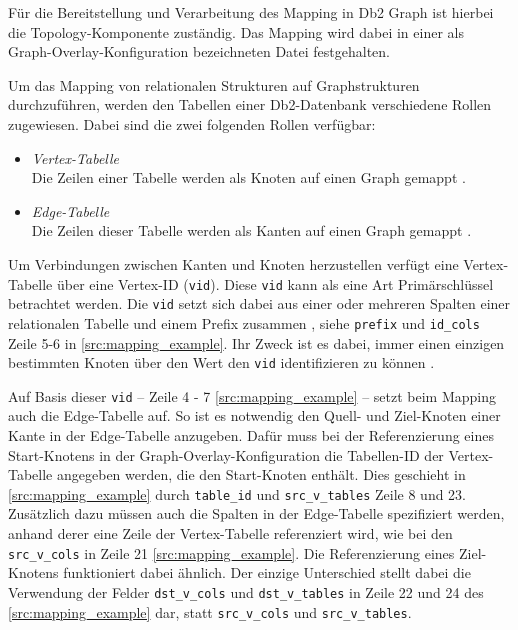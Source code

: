 Für die Bereitstellung und Verarbeitung des Mapping in Db2 Graph ist hierbei die Topology-Komponente zuständig. Das Mapping wird dabei in einer als Graph-Overlay-Konfiguration bezeichneten Datei festgehalten.  

Um das Mapping von relationalen Strukturen auf Graphstrukturen durchzuführen, werden den Tabellen einer Db2-Datenbank verschiedene Rollen zugewiesen. Dabei sind die zwei folgenden Rollen verfügbar:
\begin{itemize}
    \item \textit{Vertex-Tabelle}\\Die Zeilen einer Tabelle werden als Knoten auf einen Graph gemappt \cite{sigmod_tian, yt_tian}.
    \item \textit{Edge-Tabelle}\\Die Zeilen dieser Tabelle werden als Kanten auf einen Graph gemappt \cite{sigmod_tian, yt_tian}.
\end{itemize}


Um Verbindungen zwischen Kanten und Knoten herzustellen verfügt eine Vertex-Tabelle über eine Vertex-ID (\texttt{vid}). Diese \texttt{vid} kann als eine Art Primärschlüssel betrachtet werden. Die \texttt{vid} setzt sich dabei aus einer oder mehreren Spalten einer relationalen Tabelle und einem Prefix zusammen \cite{sigmod_tian, yt_tian}, siehe \texttt{prefix} und \texttt{id\_cols} Zeile 5-6 in \autoref{src:mapping_example}. Ihr Zweck ist es dabei, immer einen einzigen bestimmten Knoten über den Wert den \texttt{vid} identifizieren zu können \cite{sigmod_tian, yt_tian}. 

Auf Basis dieser \texttt{vid} -- Zeile 4 - 7 \autoref{src:mapping_example} -- setzt beim Mapping auch die Edge-Tabelle auf. So ist es notwendig den Quell- und Ziel-Knoten einer Kante in der Edge-Tabelle anzugeben. Dafür muss bei der Referenzierung eines Start-Knotens in der Graph-Overlay-Konfiguration die Tabellen-ID der Vertex-Tabelle angegeben werden, die den Start-Knoten enthält. Dies geschieht in \autoref{src:mapping_example} durch \texttt{table\_id} und \texttt{src\_v\_tables} Zeile 8 und 23. Zusätzlich dazu müssen auch die Spalten in der Edge-Tabelle spezifiziert werden, anhand derer eine Zeile der Vertex-Tabelle referenziert wird, wie bei den \texttt{src\_v\_cols} in Zeile 21 \autoref{src:mapping_example}. Die Referenzierung eines Ziel-Knotens funktioniert dabei ähnlich. Der einzige Unterschied stellt dabei die Verwendung der Felder \texttt{dst\_v\_cols} und \texttt{dst\_v\_tables} in Zeile 22 und 24 des \autoref{src:mapping_example} dar, statt \texttt{src\_v\_cols} und \texttt{src\_v\_tables}.

